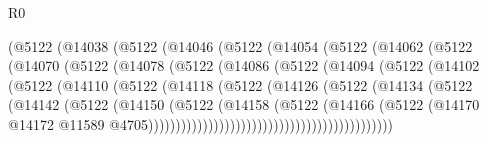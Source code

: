 \begin{lexlean}{R0}
\begin{coremodule}
                      (@5122
                        (@14038
                          (@5122
                            (@14046
                              (@5122
                                (@14054
                                  (@5122
                                    (@14062
                                      (@5122
                                        (@14070
                                          (@5122
                                            (@14078
                                              (@5122
                                                (@14086
                                                  (@5122
                                                    (@14094
                                                      (@5122
                                                        (@14102
                                                          (@5122
                                                            (@14110
                                                              (@5122
                                                                (@14118
                                                                  (@5122
                                                                    (@14126
                                                                      (@5122
                                                                        (@14134
                                                                          (@5122
                                                                            (@14142
                                                                              (@5122
                                                                                (@14150
                                                                                  (@5122
                                                                                    (@14158
                                                                                      (@5122
                                                                                        (@14166
                                                                                          (@5122
                                                                                            (@14170
                                                                                              @14172
                                                                                              @11589
                                                                                              @4705)))))))))))))))))))))))))))))))))))))))))))))

\end{coremodule}
\end{lexlean}
